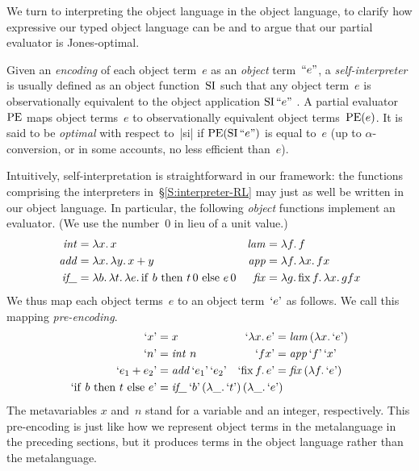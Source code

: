 We turn to interpreting the object language in the object language, to
clarify how expressive our typed object language can be and to argue that our
partial evaluator is Jones\hyp optimal.

Given an \emph{encoding} of each object term~$e$ as an \emph{object} term~$\mathinner{\mathopen{\text{``}}e\mathclose{\text{''}}}$,
a \emph{self\hyp interpreter} is usually defined as an object
function~$\operatorname{SI}$ such that any object term~$e$ is observationally
equivalent to the object application $\operatorname{SI}\mathinner{\mathopen{\text{``}}e\mathclose{\text{''}}}$
\cite{jones-partial,taha-tag,Danvy-tagging-encoding}.
A partial evaluator~$\operatorname{PE}$ maps object terms~$e$ to observationally
equivalent object terms~$\operatorname{PE}(e)$.  It is said to be
\emph{optimal} with respect to~|si| if $\operatorname{PE}(\operatorname{SI}\mathinner{\mathopen{\text{``}}e\mathclose{\text{''}}})$
is equal to~$e$ (up to $\alpha$\hyp conversion, or in some accounts, no
less efficient than~$e$).

Intuitively, self\hyp interpretation is straightforward in our
framework: the functions comprising the interpreters
in~\S\ref{S:interpreter-RL} may just as well be written in our object
language.  In particular, the following \emph{object} functions implement an
evaluator.  (We use the number~$0$ in lieu of a unit value.)
\begin{align*}
    \mathinner{\text{\textit{int\/}}} &= \mathopen{\lambda\mathord{x}.\,} x &
    \mathinner{\text{\textit{lam\/}}} &= \mathopen{\lambda\mathord{f}.\,} f \\
    \mathinner{\text{\textit{add\/}}} &= \mathopen{\lambda\mathord{x}.\,} \mathopen{\lambda\mathord{y}.\,} x+y &
    \mathinner{\text{\textit{app\/}}} &= \mathopen{\lambda\mathord{f}.\,} \mathopen{\lambda\mathord{x}.\,} fx \\
    \mathinner{\text{\textit{if\_\/}}}&= \mathopen{\lambda\mathord{b}.\,} \mathopen{\lambda\mathord{t}.\,} \mathopen{\lambda\mathord{e}.\,} \mathrm{if\ }b\mathrm{\ then\ }t\,0\mathrm{\ else\ }e\,0 &
    \mathinner{\text{\textit{fix\/}}} &= \mathopen{\lambda\mathord{g}.\,} \mathopen{\mathrm{fix\,}\mathord{f}.\,} \mathopen{\lambda\mathord{x}.\,} gfx
\end{align*}
We thus map each object terms~$e$ to an object term~$\mathinner{\mathopen{\text{`}}e\mathclose{\text{'}}}$ as follows.
We call this mapping \emph{pre-encoding}.
\begin{align*}
    \encode{x} &= x &
    \encode{\fun{x}e} &= \ident{lam} (\fun{x} \encode{e}) \\
    \encode{n} &= \ident{int}\, n &
    \encode{fx} &= \ident{app} \encode{f} \encode{x} \\
    \encode{e_1 + e_2} &= \ident{add} \encode{e_1} \encode{e_2} &
    \encode{\fix{f}e} &= \ident{fix} (\fun{f} \encode{e}) \\
    \encode{\cond{b}{t}{e}} &= \rlap{$\ident{if\_} \encode{b}
        \left(\fun{\_}\encode{t}\right) \left(\fun{\_}\encode{e}\right)$}
\end{align*}
The metavariables $x$ and~$n$ stand for a variable and an integer,
respectively.
This pre-encoding is just like how we represent object terms in the
metalanguage in the preceding sections, but it produces
terms in the object language rather than the metalanguage.

